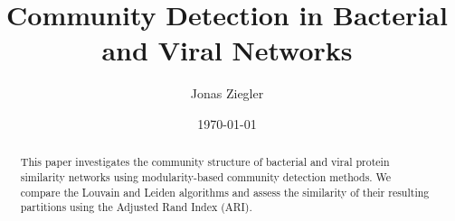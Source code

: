 \documentclass[11pt,a4paper]{article}
\title{Community Detection in Bacterial and Viral Networks}
\author{Jonas Ziegler}
\date{\today}
\begin{document}
\maketitle

\begin{abstract}
This paper investigates the community structure of bacterial and viral protein 
similarity networks using modularity-based community detection methods. 
We compare the Louvain and Leiden algorithms and assess the similarity of their 
resulting partitions using the Adjusted Rand Index (ARI).
\end{abstract}











\printbibliography
\end{document}
